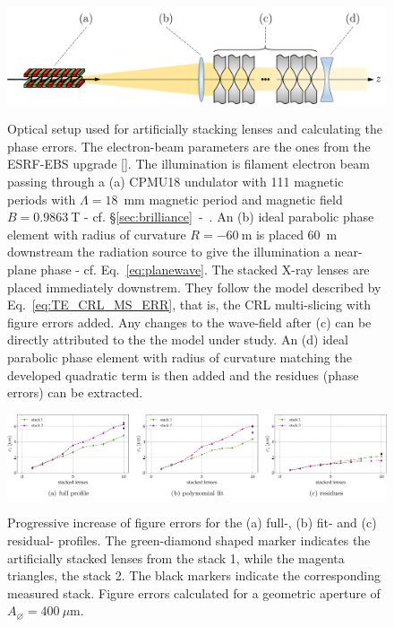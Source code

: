 \begin{refsection}
\begin{figure}[t]
    \centering
    {\includegraphics[width=.7\linewidth]{figures/ch04b/recovered_phase.png}}
    \caption[Optical layout used for artificially stacking lenses]{Optical setup used for artificially stacking lenses and calculating the phase errors. The electron-beam parameters are the ones from the ESRF-EBS upgrade [\cite{orangebook}]. The illumination is filament electron beam passing through a (a) CPMU18 undulator with 111 magnetic periods with $\Lambda=18$~mm magnetic period and magnetic field $B=0.9863~$T - cf. \S\ref{sec:brilliance}~-~\textit{}. An (b) ideal parabolic phase element with radius of curvature $R=-60~$m is placed 60~m downstream the radiation source to give the illumination a near-plane phase - cf. Eq.~\ref{eq:planewave}. The stacked X-ray lenses are placed immediately downstrem. They follow the model described by Eq.~\ref{eq:TE_CRL_MS_ERR}, that is, the CRL multi-slicing with figure errors added. Any changes to the wave-field after (c) can be directly attributed to the the model under study. An (d) ideal parabolic phase element with radius of curvature matching the developed quadratic term is then added and the residues (phase errors) can be extracted.}
    \label{fig:accumulated_extraction}
\end{figure}

\begin{figure}[t]
    \centering
    {\includegraphics[width=1.\linewidth]{figures/ch04b/stacking_errors.pdf}}
    \caption[Accumulative figure errors]{Progressive increase of figure errors for the (a) full-, (b) fit- and (c) residual- profiles. The green-diamond shaped marker indicates the artificially stacked lenses from the stack 1, while the magenta triangles, the stack 2. The black markers indicate the corresponding measured stack. Figure errors calculated for a geometric aperture of $A_{\diameter}=400~\mu\text{m}$.}
    \label{fig:stacking_errors}
\end{figure}


\end{refsection}
